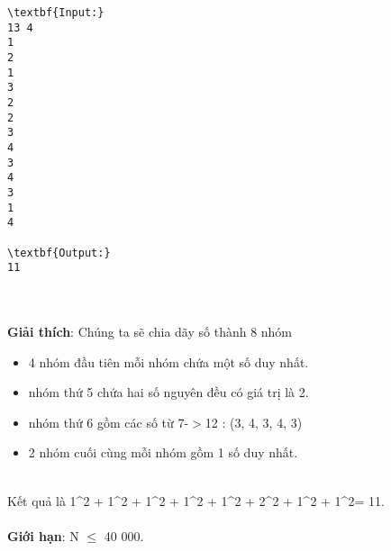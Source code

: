 \begin{verbatim}
\textbf{Input:}
13 4
1
2
1
3
2
2
3
4
3
4
3
1
4

\textbf{Output:}
11\end{verbatim}


\\
\\\textbf{Giải thích}: Chúng ta sẽ chia dãy số thành 8 nhóm
\begin{itemize}
	\item 4 nhóm đầu tiên mỗi nhóm chứa một số duy nhất.
	\item nhóm thứ 5 chứa hai số nguyên đều có giá trị là 2.
	\item nhóm thứ 6 gồm các số từ 7-$>$12 : (3, 4, 3, 4, 3)
	\item 2 nhóm cuối cùng mỗi nhóm gồm 1 số duy nhất.
\end{itemize}


\\Kết quả là 1^2 + 1^2 + 1^2 + 1^2 + 1^2 + 2^2 + 1^2 + 1^2= 11.
\\
\\\textbf{Giới hạn}: N  $\le$  40 000.